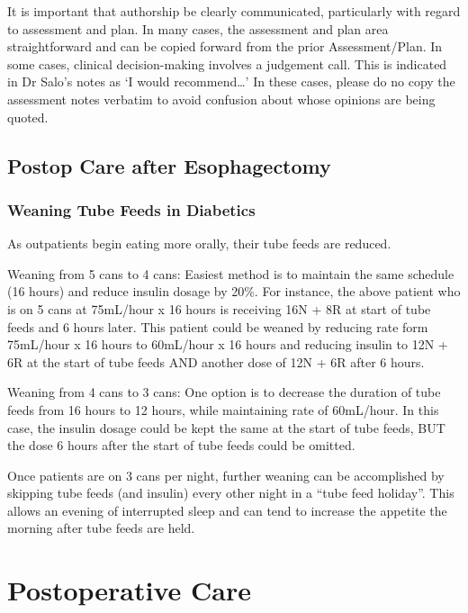 \documentclass[
]{book}
\begin{document}
It is important that authorship be clearly communicated, particularly with regard to assessment and plan. In many cases, the assessment and plan area straightforward and can be copied forward from the prior Assessment/Plan. In some cases, clinical decision-making involves a judgement call. This is indicated in Dr Salo's notes as `I would recommend\ldots{}' In these cases, please do no copy the assessment notes verbatim to avoid confusion about whose opinions are being quoted.

\hypertarget{mie_postop}{%
\chapter{Postop Care after Esophagectomy}\label{mie_postop}}

\hypertarget{weaning-tube-feeds-in-diabetics}{%
\section{Weaning Tube Feeds in Diabetics}\label{weaning-tube-feeds-in-diabetics}}

As outpatients begin eating more orally, their tube feeds are reduced.

Weaning from 5 cans to 4 cans: Easiest method is to maintain the same schedule (16 hours) and reduce insulin dosage by 20\%. For instance, the above patient who is on 5 cans at 75mL/hour x 16 hours is receiving 16N + 8R at start of tube feeds and 6 hours later. This patient could be weaned by reducing rate form 75mL/hour x 16 hours to 60mL/hour x 16 hours and reducing insulin to 12N + 6R at the start of tube feeds AND another dose of 12N + 6R after 6 hours.

Weaning from 4 cans to 3 cans: One option is to decrease the duration of tube feeds from 16 hours to 12 hours, while maintaining rate of 60mL/hour. In this case, the insulin dosage could be kept the same at the start of tube feeds, BUT the dose 6 hours after the start of tube feeds could be omitted.

Once patients are on 3 cans per night, further weaning can be accomplished by skipping tube feeds (and insulin) every other night in a ``tube feed holiday''. This allows an evening of interrupted sleep and can tend to increase the appetite the morning after tube feeds are held.

\hypertarget{part-postoperative-care}{%
\part*{Postoperative Care}\label{part-postoperative-care}}
\end{document}

